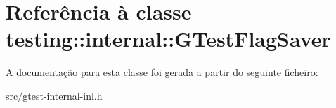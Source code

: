 \hypertarget{classtesting_1_1internal_1_1GTestFlagSaver}{\section{Referência à classe testing\-:\-:internal\-:\-:G\-Test\-Flag\-Saver}
\label{classtesting_1_1internal_1_1GTestFlagSaver}
}


A documentação para esta classe foi gerada a partir do seguinte ficheiro\-:\begin{DoxyCompactItemize}
\item 
src/gtest-\/internal-\/inl.\-h\end{DoxyCompactItemize}
